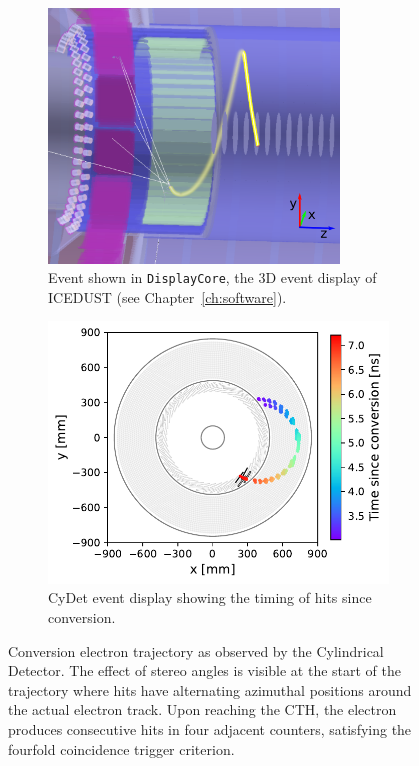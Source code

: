 \begin{figure}
    \centering
    \begin{subfigure}[b]{0.43\textwidth}
    \centering
    \includegraphics[width=0.85\textwidth]{chapter2/signal_event_display_crop_axes.pdf}
    \vspace{1.18cm}
    \caption{Event shown in \texttt{DisplayCore}, the 3D event display of
    ICEDUST (see Chapter~\ref{ch:software}).}
    \end{subfigure}
    \hfill
    \begin{subfigure}[b]{0.53\textwidth}
    \centering
    \includegraphics[width=0.99\textwidth]{chapter2/cydet_signal_track_v4.pdf}
    \caption{CyDet event display showing the timing of hits since conversion.}
    \end{subfigure}
    
    \caption{ Conversion electron trajectory as observed by the Cylindrical
    Detector. The effect of stereo angles is visible at the start of the
    trajectory where hits have alternating azimuthal positions around the actual
    electron track. Upon reaching the CTH, the electron produces consecutive
    hits in four adjacent counters, satisfying the fourfold coincidence trigger
    criterion.}
    \label{fig:cydet_signal_event}
\end{figure}


